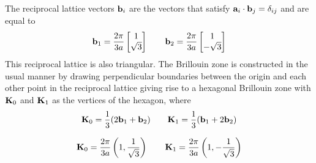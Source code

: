 The reciprocal lattice vectors $\mathbf{b}_i$ are the vectors that satisfy $\mathbf{a}_i\cdot \mathbf{b}_j=\delta_{ij}$ and are equal to 
\begin{equation}
    \mathbf{b}_1=\frac{2\pi}{3a}\begin{bmatrix}
        1 \\ \sqrt 3
    \end{bmatrix}
    \quad \quad
    \mathbf{b}_2=\frac{2\pi}{3a}\begin{bmatrix}
        1 \\ -\sqrt 3
    \end{bmatrix}
\end{equation}
This reciprocal lattice is also triangular. The Brillouin zone is constructed in the usual manner by drawing perpendicular boundaries between the origin and each other point in the reciprocal lattice giving rise to a hexagonal Brillouin zone with $\mathbf{K}_0$ and $\mathbf{K}_1$ as the vertices of the hexagon, where 
\[
    \mathbf{K}_0=\frac 13 (2\mathbf{b}_1+\mathbf{b}_2)\quad \quad \mathbf{K}_1=\frac 13 (\mathbf{b}_1+2\mathbf{b}_2)
\]

\begin{equation}
   \mathbf{K}_0=\frac{2\pi}{3a}\left(1,\frac 1{\sqrt 3}\right)\quad\quad \mathbf{K}_1=\frac{2\pi}{3a}\left(1,-\frac 1{\sqrt 3}\right)
\end{equation}













